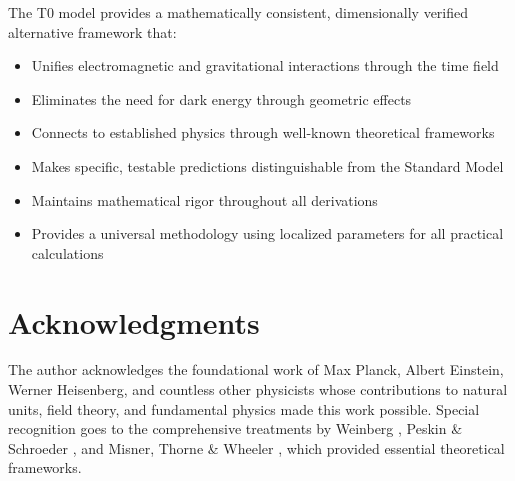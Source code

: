\documentclass[12pt,a4paper]{article}
\begin{document}
	\begin{tcolorbox}[colback=green!5!white,colframe=green!75!black,title=T0 Model: A Unified Framework]
		The T0 model provides a mathematically consistent, dimensionally verified alternative framework that:
		\begin{itemize}
			\item Unifies electromagnetic and gravitational interactions through the time field
			\item Eliminates the need for dark energy through geometric effects
			\item Connects to established physics through well-known theoretical frameworks
			\item Makes specific, testable predictions distinguishable from the Standard Model
			\item Maintains mathematical rigor throughout all derivations
			\item Provides a universal methodology using localized parameters for all practical calculations
		\end{itemize}
	\end{tcolorbox}
	
	\section*{Acknowledgments}
	\label{sec:acknowledgments}
	
	The author acknowledges the foundational work of Max Planck, Albert Einstein, Werner Heisenberg, and countless other physicists whose contributions to natural units, field theory, and fundamental physics made this work possible. Special recognition goes to the comprehensive treatments by Weinberg \citep{weinberg1995,weinberg2008}, Peskin \& Schroeder \citep{peskin1995}, and Misner, Thorne \& Wheeler \citep{misner1973}, which provided essential theoretical frameworks.
	
\end{document}
